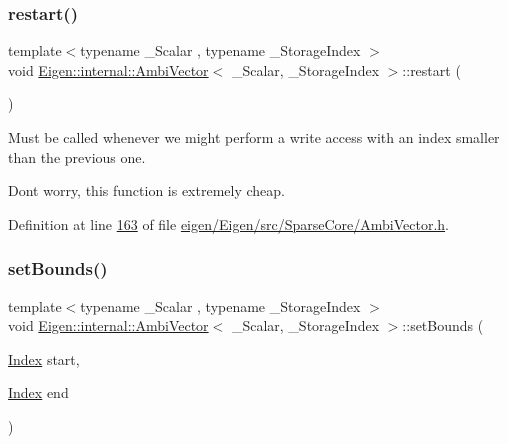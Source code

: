 \mbox{\label{class_eigen_1_1internal_1_1_ambi_vector_a518fc22cdfa37e5340350e2a69fa8f1a}} 
\subsubsection{\texorpdfstring{restart()}{restart()}}
{\footnotesize\ttfamily template$<$typename \+\_\+\+Scalar , typename \+\_\+\+Storage\+Index $>$ \\
void \hyperlink{class_eigen_1_1internal_1_1_ambi_vector}{Eigen\+::internal\+::\+Ambi\+Vector}$<$ \+\_\+\+Scalar, \+\_\+\+Storage\+Index $>$\+::restart (\begin{DoxyParamCaption}{ }\end{DoxyParamCaption})}

Must be called whenever we might perform a write access with an index smaller than the previous one.

Don\textquotesingle{}t worry, this function is extremely cheap. 

Definition at line \hyperlink{eigen_2_eigen_2src_2_sparse_core_2_ambi_vector_8h_source_l00163}{163} of file \hyperlink{eigen_2_eigen_2src_2_sparse_core_2_ambi_vector_8h_source}{eigen/\+Eigen/src/\+Sparse\+Core/\+Ambi\+Vector.\+h}.

\mbox{\label{class_eigen_1_1internal_1_1_ambi_vector_a8a37e06682a29a63239d914de342096c}} 
\subsubsection{\texorpdfstring{set\+Bounds()}{setBounds()}\hspace{0.1cm}{\footnotesize\ttfamily [1/2]}}
{\footnotesize\ttfamily template$<$typename \+\_\+\+Scalar , typename \+\_\+\+Storage\+Index $>$ \\
void \hyperlink{class_eigen_1_1internal_1_1_ambi_vector}{Eigen\+::internal\+::\+Ambi\+Vector}$<$ \+\_\+\+Scalar, \+\_\+\+Storage\+Index $>$\+::set\+Bounds (\begin{DoxyParamCaption}\item[{\hyperlink{namespace_eigen_a62e77e0933482dafde8fe197d9a2cfde}{Index}}]{start,  }\item[{\hyperlink{namespace_eigen_a62e77e0933482dafde8fe197d9a2cfde}{Index}}]{end }\end{DoxyParamCaption})\hspace{0.3cm}{\ttfamily [inline]}}

